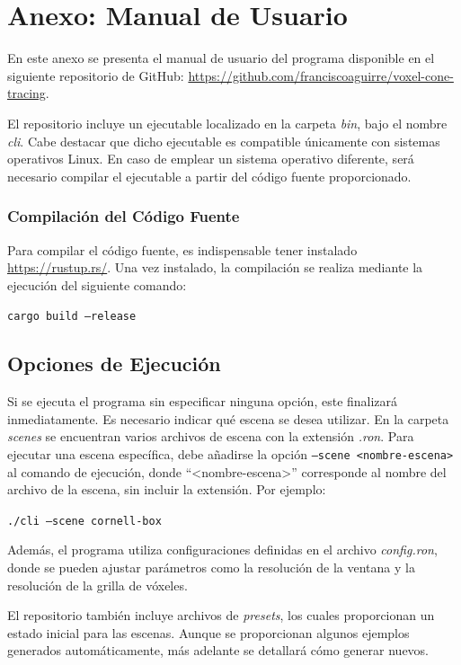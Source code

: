 \graphicspath{{appendices/figures}}

\chapter{Anexo: Manual de Usuario}\label{appendix:manual}

En este anexo se presenta el manual de usuario del programa disponible en el siguiente repositorio de GitHub: \href{https://github.com/franciscoaguirre/voxel-cone-tracing}{https://github.com/franciscoaguirre/voxel-cone-tracing}.

El repositorio incluye un ejecutable localizado en la carpeta \textit{bin}, bajo el nombre \textit{cli}. Cabe destacar que dicho ejecutable es compatible únicamente con sistemas operativos Linux. En caso de emplear un sistema operativo diferente, será necesario compilar el ejecutable a partir del código fuente proporcionado.

\subsection{Compilación del Código Fuente}

Para compilar el código fuente, es indispensable tener instalado \href{Rust}{https://rustup.rs/}. Una vez instalado, la compilación se realiza mediante la ejecución del siguiente comando:

\texttt{cargo build --release}

\section{Opciones de Ejecución}

Si se ejecuta el programa sin especificar ninguna opción, este finalizará inmediatamente. Es necesario indicar qué escena se desea utilizar. En la carpeta \textit{scenes} se encuentran varios archivos de escena con la extensión \textit{.ron}. Para ejecutar una escena específica, debe añadirse la opción \texttt{--scene <nombre-escena>} al comando de ejecución, donde ``<nombre-escena>'' corresponde al nombre del archivo de la escena, sin incluir la extensión. Por ejemplo:

\texttt{./cli --scene cornell-box}

Además, el programa utiliza configuraciones definidas en el archivo \textit{config.ron}, donde se pueden ajustar parámetros como la resolución de la ventana y la resolución de la grilla de vóxeles.

El repositorio también incluye archivos de \textit{presets}, los cuales proporcionan un estado inicial para las escenas. Aunque se proporcionan algunos ejemplos generados automáticamente, más adelante se detallará cómo generar nuevos.


